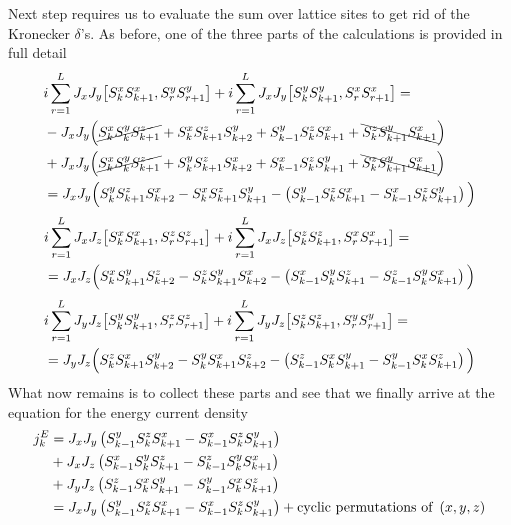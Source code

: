 Next step requires us to evaluate the sum over lattice sites to get rid of the Kronecker \(\delta{}\)'s. As before, one of the three parts of the calculations is provided in full detail
\begin{align}
    &i\sum_{r=1}^{L}  J_{x} J_{y}\comm{\Sx_{k}\Sx_{k+1}}{\Sy_{r}\Sy_{r+1}} + i\sum_{r=1}^{L} J_{x} J_{y}\comm{\Sy_{k}\Sy_{k+1}}{\Sx_{r}\Sx_{r+1}} =\nonumber \\
    & - J_x J_y \Big( \cancel{\Sx_k \Sy_k \Sz_{k+1}} +  \Sx_k \Sz_{k+1} \Sy_{k+2} + \Sy_{k-1} \Sz_k \Sx_{k+1} +\bcancel{\Sz_k \Sy_{k+1} \Sx_{k+1}}\Big)\nonumber\\
    &+  J_x J_y \Big(  \cancel{\Sx_k \Sy_k \Sz_{k+1}} + \Sy_k \Sz_{k+1} \Sx_{k+2} + \Sx_{k-1} \Sz_k \Sy_{k+1} + \bcancel{\Sz_k \Sy_{k+1} \Sx_{k+1}}\Big)\nonumber\\
    &= J_x J_y \Big( \Sy_k \Sz_{k+1} \Sx_{k+2} - \Sx_k \Sz_{k+1} \Sy_{k+1} - \left(\Sy_{k-1}\Sz_k \Sx_{k+1} - \Sx_{k-1}\Sz_{k}\Sy_{k+1}\right) \Big)
\end{align}
\begin{align}
    &i\sum_{r=1}^{L}  J_{x} J_{z}\comm{\Sx_{k}\Sx_{k+1}}{\Sz_{r}\Sz_{r+1}} + i\sum_{r=1}^{L} J_{x} J_{z}\comm{\Sz_{k}\Sz_{k+1}}{\Sx_{r}\Sx_{r+1}} = \nonumber\\
    &= J_x J_z \Big( \Sx_k \Sy_{k+1} \Sz_{k+2} - \Sz_k \Sy_{k+1} \Sx_{k+2} - \left(\Sx_{k-1}\Sy_k \Sz_{k+1} - \Sz_{k-1}\Sy_{k}\Sx_{k+1}\right) \Big)
\end{align}
\begin{align}    
    &i\sum_{r=1}^{L}  J_{y} J_{z}\comm{\Sy_{k}\Sy_{k+1}}{\Sz_{r}\Sz_{r+1}} + i\sum_{r=1}^{L} J_{y} J_{z}\comm{\Sz_{k}\Sz_{k+1}}{\Sy_{r}\Sy_{r+1}} = \nonumber\\
    &= J_y J_z \Big( \Sz_k \Sx_{k+1} \Sy_{k+2} - \Sy_k \Sx_{k+1} \Sz_{k+2} - \left(\Sz_{k-1}\Sx_k \Sy_{k+1} - \Sy_{k-1}\Sx_{k}\Sz_{k+1}\right) \Big)
\end{align}
What now remains is to collect these parts and see that we finally arrive at the equation for the energy current density
\begin{align}
    j_k^E &= J_x J_y \left(S^{y}_{k-1}S^{z}_k S^{x}_{k+1} - S^{x}_{k-1}S^{z}_{k}S^{y}_{k+1}\right) \nonumber \\
    &+ J_x J_z \left(S^{x}_{k-1}S^{y}_k S^{z}_{k+1} - S^{z}_{k-1}S^{y}_{k}S^{x}_{k+1}\right) \nonumber \\
    &+ J_y J_z \left(S^{z}_{k-1}S^{x}_k S^{y}_{k+1} - S^{y}_{k-1}S^{x}_{k}S^{z}_{k+1}\right) \nonumber \\
    &= J_x J_y \left(S^{y}_{k-1}S^{z}_k S^{x}_{k+1} - S^{x}_{k-1}S^{z}_{k}S^{y}_{k+1}\right) + \text{cyclic permutations of } \left(x,y,z\right)
    \label{eq:energy current density}
\end{align}
